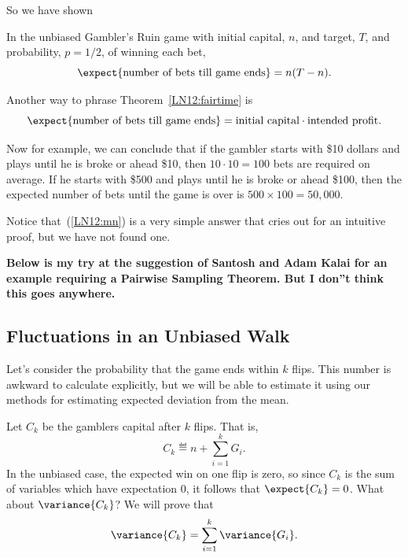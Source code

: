 \begin{example}
So we have shown
\begin{theorem}\label{LN12:fairtime}
In the unbiased Gambler's Ruin game with initial capital, $n$, and target,
$T$, and probability, $p = 1/2$, of winning each bet,
\begin{equation}
\expect{\text{number of bets till game ends}} = n(T-n).
\end{equation}
\end{theorem}

Another way to phrase Theorem~\ref{LN12:fairtime} is
\begin{equation}\label{LN12:mn}
\expect{\text{number of bets till game ends}} = \text{initial capital}
\cdot \text{intended profit}.
\end{equation}

Now for example, we can conclude that if the gambler starts with \$10
dollars and plays until he is broke or ahead \$10, then $10 \cdot 10 = 100$
bets are required on average.  If he starts with \$500 and plays until he
is broke or ahead \$100, then the expected number of bets until the game is
over is $500 \times 100 = 50,000$.

Notice that~(\ref{LN12:mn}) is a very simple answer that cries out for an
intuitive proof, but we have not found one.
\fi

\iffalse

\textbf{Below is my try at the suggestion of Santosh and Adam Kalai for an
example requiring a Pairwise  Sampling Theorem.  But I
don''t think this goes anywhere. }

\subsection{Fluctuations in an Unbiased Walk}

Let's consider the probability that the game ends within $k$ flips.  This
number is awkward to calculate explicitly, but we will be able to estimate
it using our methods for estimating expected deviation from the mean.

Let $C_k$ be the gamblers capital after $k$ flips.  That is,
\[
C_k \eqdef n + \sum_{i=1}^k G_i.
\]
In the unbiased case, the expected win on one flip is zero, so since $C_k$
is the sum of variables which have expectation 0, it follows that
$\expect{C_k} = 0$.  What about $\variance{C_k}$?  We will prove that
\begin{equation}\label{LN12:sumvarg}
\variance{C_k} = \sum_{i=1}^k \variance{G_i}.
\end{equation}


\end{example}
